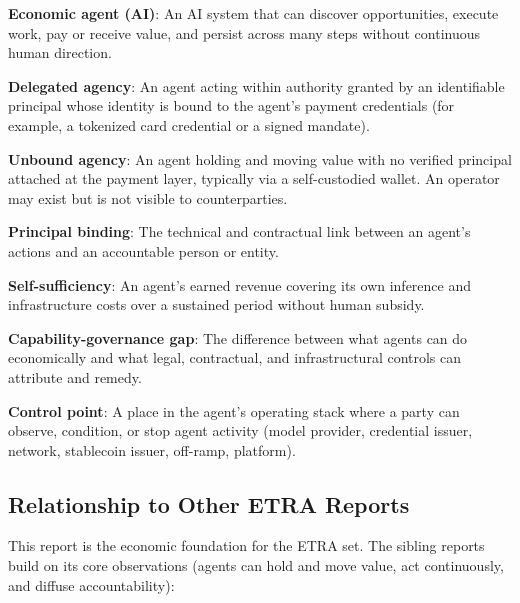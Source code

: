 \documentclass[11pt,letterpaper]{article}
\begin{document}
\begin{defbox}
\textbf{Economic agent (AI)}: An AI system that can discover opportunities, execute work, pay or receive value, and persist across many steps without continuous human direction.

\textbf{Delegated agency}: An agent acting within authority granted by an identifiable principal whose identity is bound to the agent's payment credentials (for example, a tokenized card credential or a signed mandate).

\textbf{Unbound agency}: An agent holding and moving value with no verified principal attached at the payment layer, typically via a self-custodied wallet. An operator may exist but is not visible to counterparties.

\textbf{Principal binding}: The technical and contractual link between an agent's actions and an accountable person or entity.

\textbf{Self-sufficiency}: An agent's earned revenue covering its own inference and infrastructure costs over a sustained period without human subsidy.

\textbf{Capability-governance gap}: The difference between what agents can do economically and what legal, contractual, and infrastructural controls can attribute and remedy.

\textbf{Control point}: A place in the agent's operating stack where a party can observe, condition, or stop agent activity (model provider, credential issuer, network, stablecoin issuer, off-ramp, platform).
\end{defbox}

\subsection{Relationship to Other ETRA Reports}

This report is the economic foundation for the ETRA set. The sibling reports build on its core observations (agents can hold and move value, act continuously, and diffuse accountability):
\end{document}
